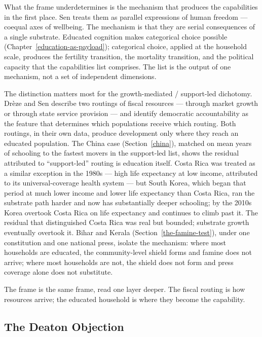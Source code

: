 \documentclass[12pt,letterpaper]{article}
\begin{document}
{What the frame underdetermines is the mechanism that produces the capabilities in the first place. Sen treats them as parallel expressions of human freedom --- coequal axes of wellbeing. The mechanism is that they are serial consequences of a single substrate. Educated cognition makes categorical choice possible (Chapter~\ref{education-as-payload}); categorical choice, applied at the household scale, produces the fertility transition, the mortality transition, and the political capacity that the capabilities list comprises. The list is the output of one mechanism, not a set of independent dimensions.

The distinction matters most for the growth-mediated / support-led dichotomy. Drèze and Sen describe two routings of fiscal resources --- through market growth or through state service provision --- and identify democratic accountability as the feature that determines which populations receive which routing. Both routings, in their own data, produce development only where they reach an educated population. The China case (Section~\ref{china}), matched on mean years of schooling to the fastest movers in the support-led list, shows the residual attributed to ``support-led'' routing is education itself. Costa Rica was treated as a similar exception in the 1980s --- high life expectancy at low income, attributed to its universal-coverage health system --- but South Korea, which began that period at much lower income and lower life expectancy than Costa Rica, ran the substrate path harder and now has substantially deeper schooling; by the 2010s Korea overtook Costa Rica on life expectancy and continues to climb past it. The residual that distinguished Costa Rica was real but bounded; substrate growth eventually overtook it. Bihar and Kerala (Section~\ref{the-famine-test}), under one constitution and one national press, isolate the mechanism: where most households are educated, the community-level shield forms and famine does not arrive; where most households are not, the shield does not form and press coverage alone does not substitute.

The frame is the same frame, read one layer deeper. The fiscal routing is how resources arrive; the educated household is where they become the capability.

\subsection{The Deaton Objection}\label{the-deaton-objection}

}
\end{document}

